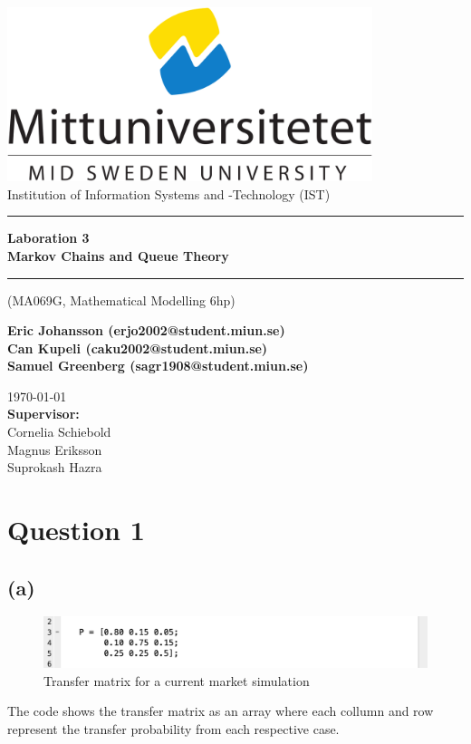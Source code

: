 \documentclass{article}
\makeatletter
\newcommand{\getauthor}{Eric Johansson (erjo2002@student.miun.se)\\Can Kupeli (caku2002@student.miun.se) \\Samuel Greenberg (sagr1908@student.miun.se)} %
\newcommand{\gettitle}{Laboration 3 \\Markov Chains and Queue Theory} %
\newcommand{\getcourse}{(MA069G, Mathematical Modelling 6hp)} %
\newcommand{\getsupervisor}{Cornelia Schiebold\\Magnus Eriksson\\Suprokash Hazra}
\makeatother
\begin{document}
\begin{titlepage}
	\begin{center}
		\vspace*{1cm}

		\includegraphics[width=0.8\textwidth]{imgs/msu.png}\\[0.5cm]
		\Large
		Institution of Information Systems and -Technology (IST)\\[1cm]
		\Huge
		\rule{\textwidth}{1px}
		\textbf{\gettitle}
		\rule[0.5cm]{\textwidth}{1px}

		\large
		\getcourse{}
		\vspace{1cm}

		\Large
		\textbf{\getauthor}\\

		\vfill


		\vspace{0.8cm}

		\small
		\today \\
		\Large
		\textbf{Supervisor:}\\
		\getsupervisor{}

	\end{center}
\end{titlepage}
\tableofcontents
\newpage
{}





\section{Question 1}
\subsection{(a)}
\begin{figure}[H]
        \includegraphics[width=\linewidth]{./imgs/1a.png}
        \caption{Transfer matrix for a current market simulation}
\end{figure}
The code shows the transfer matrix as an array where each collumn and row represent the transfer probability from each respective case.
\end{document}
